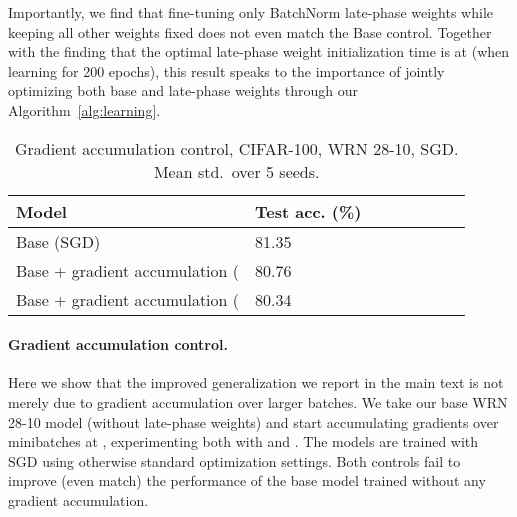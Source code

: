\documentclass{article} \usepackage{iclr2021_conference,times}
\begin{document}
Importantly, we find that fine-tuning only BatchNorm late-phase weights while keeping all other weights fixed does not even match the Base control. Together with the finding that the optimal late-phase weight initialization time is at  (when learning for 200 epochs), this result speaks to the importance of jointly optimizing both base and late-phase weights through our Algorithm~\ref{alg:learning}.


\begin{table}
\centering
  \caption{Gradient accumulation control, CIFAR-100, WRN 28-10, SGD. Mean  std.~over 5 seeds.}
  \label{tab:gead-control}
  \vspace{-0.2cm}
  \centering
  {\renewcommand{\arraystretch}{1.1}\setlength{\tabcolsep}{4pt}
  \begin{tabular}{@{}llllllll@{}} 
    \toprule
Model & Test acc. (\%) \\\midrule
Base (SGD)      &  81.35     \\
Base + gradient accumulation (   & 80.76   \\
Base + gradient accumulation (  & 80.34      \\\bottomrule
    \end{tabular}}
\end{table}

\paragraph{Gradient accumulation control.} Here we show that the improved generalization we report in the main text is not merely due to gradient accumulation over larger batches. We take our base WRN 28-10 model (without late-phase weights) and start accumulating gradients over  minibatches at , experimenting both with  and . The models are trained with SGD using otherwise standard optimization settings. Both controls fail to improve (even match) the performance of the base model trained without any gradient accumulation.
\end{document}
